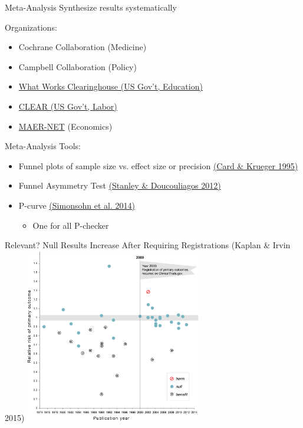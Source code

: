 \documentclass{beamer}
\begin{document}
\begin{frame}{Meta-Analysis}
Synthesize results systematically

\vspace{.2in}
Organizations:
\begin{itemize}[<.->]
\item Cochrane Collaboration (Medicine)
\item Campbell Collaboration (Policy)
\item \href{http://ies.ed.gov/ncee/wwc/}{What Works Clearinghouse (US Gov't, Education)}
\item \href{http://clear.dol.gov/}{CLEAR (US Gov't, Labor)}
\item \href{https://www.hendrix.edu/maer-network/}{MAER-NET} (Economics)
\end{itemize}
\end{frame}

\begin{frame}{Meta-Analysis}
Tools:
\begin{itemize}[<.->]
\item Funnel plots of sample size vs. effect size or precision \href{http://www.jstor.org/stable/2117925}{(Card \& Krueger 1995)}
\item Funnel Asymmetry Test \href{https://books.google.com/books?id=jSQEdEsL7VoC}{(Stanley \& Doucouliagos 2012)}
\item P-curve \href{http://p-curve.com/}{(Simonsohn et al. 2014)} \href{http://p-curve.com/}{}
\begin{itemize}
	\item One for all P-checker \href{http://shinyapps.org/apps/p-checker/}{}	
\end{itemize}
\end{itemize}
\end{frame}


\begin{frame}{Relevant? Null Results Increase After Requiring Registrations (Kaplan \& Irvin 2015)}
\includegraphics[height = 3in]{../Images/plosone.PNG}

\end{frame}
\end{document}
